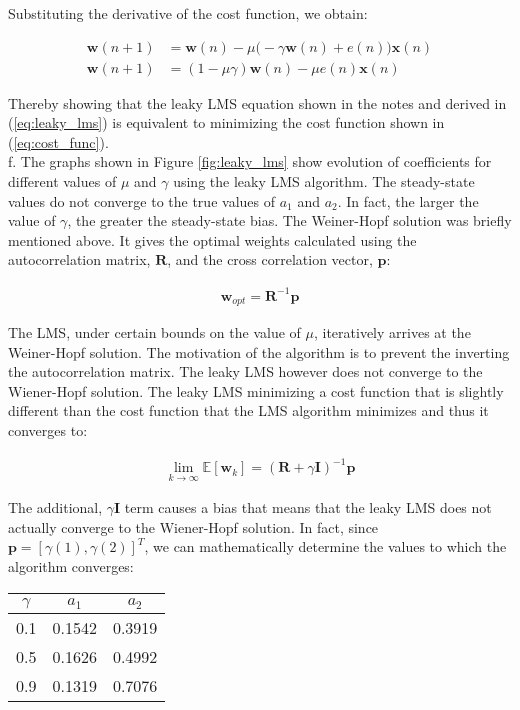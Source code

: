 \noindent{}Substituting the derivative of the cost function, we obtain:

\begin{align}
\textbf{w}(n+1) &= \textbf{w}(n) - \mu \Bigg(-\gamma \textbf{w}(n) + e(n)\Bigg)\textbf{x}(n) \nonumber\\
\textbf{w}(n+1) &= (1-\mu\gamma)\textbf{w}(n) - \mu e(n)\textbf{x}(n) \label{eq:leaky_lms}
\end{align}

\noindent{}Thereby showing that the leaky LMS equation shown in the notes and derived in (\ref{eq:leaky_lms}) is equivalent to minimizing the cost function shown in (\ref{eq:cost_func}).\\

\noindent{}f. The graphs shown in Figure \ref{fig:leaky_lms} show evolution of coefficients for different values of $\mu$ and $\gamma$ using the leaky LMS algorithm. The steady-state values do not converge to the true values of $a_1$ and $a_2$. In fact, the larger the value of $\gamma$, the greater the steady-state bias. The Weiner-Hopf solution was briefly mentioned above. It gives the optimal weights calculated using the autocorrelation matrix, $\textbf{R}$, and the cross correlation vector, $\textbf{p}$:

\begin{align*}
\textbf{w}_{opt} = \textbf{R}^{-1}\textbf{p}
\end{align*}

\noindent{}The LMS, under certain bounds on the value of $\mu$, iteratively arrives at the Weiner-Hopf solution. The motivation of the algorithm is to prevent the inverting the autocorrelation matrix. The leaky LMS however does not converge to the Wiener-Hopf solution. The leaky LMS minimizing a cost function that is slightly different than the cost function that the LMS algorithm minimizes and thus it converges to:

\begin{align*}
\lim_{k \rightarrow \infty} \mathbb{E}[\textbf{w}_{k}] = (\textbf{R} + \gamma\textbf{I})^{-1}\textbf{p}
\end{align*}

\noindent{}The additional, $\gamma\textbf{I}$ term causes a bias that means that the leaky LMS does not actually converge to the Wiener-Hopf solution. In fact, since $\textbf{p} = [\gamma(1), \gamma(2)]^T$, we can mathematically determine the values to which the algorithm converges:

\begin{table}[H]
\centering
\begin{tabular}{|c|c|c|}
\hline
$\gamma$ & $a_1$     & $a_2$     \\ \hline
0.1   & 0.1542 & 0.3919 \\ \hline
0.5   & 0.1626 & 0.4992 \\ \hline
0.9   & 0.1319 & 0.7076 \\ \hline
\end{tabular}
\end{table}

